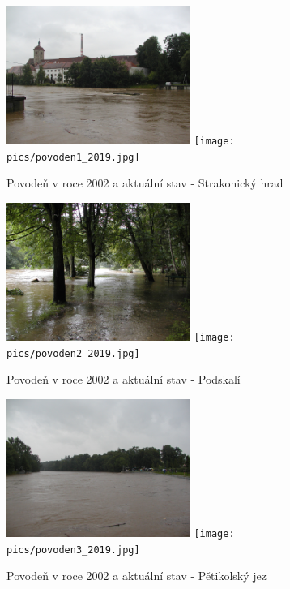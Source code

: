 \documentclass[thesis=M,czech]{FITthesis}[2012/06/26]
\begin{document}
\begin{figure}[htp]
\centering
\includegraphics[width=6cm]{pics/povoden1.jpg}
\texttt{[image: pics/povoden1\_2019.jpg]}
\caption{Povodeň v roce 2002 a aktuální stav - Strakonický hrad}
\label{obr:povoden_hrad}
\end{figure}

\begin{figure}[h!]
\centering
\includegraphics[width=6cm]{pics/povoden2.jpg}
\texttt{[image: pics/povoden2\_2019.jpg]}
\caption{Povodeň v roce 2002 a aktuální stav - Podskalí}
\label{obr:povoden_hrad}
\end{figure}

\begin{figure}[h!]
\centering
\includegraphics[width=6cm]{pics/povoden3.jpg}
\texttt{[image: pics/povoden3\_2019.jpg]}
\caption{Povodeň v roce 2002 a aktuální stav - Pětikolský jez}
\label{obr:povoden_hrad}
\end{figure}
\end{document}
